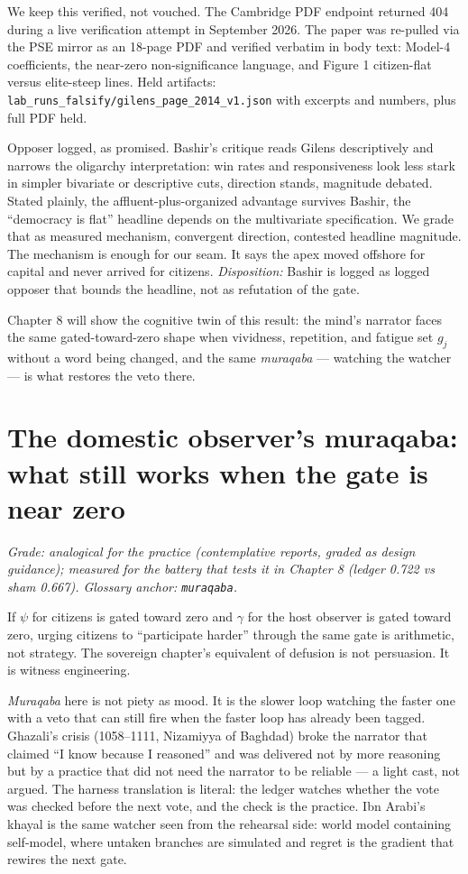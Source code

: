 We keep this verified, not vouched. The Cambridge PDF endpoint returned 404 during a live verification attempt in September 2026. The paper was re-pulled via the PSE mirror as an 18-page PDF and verified verbatim in body text: Model-4 coefficients, the near-zero non-significance language, and Figure 1 citizen-flat versus elite-steep lines. Held artifacts: \texttt{lab\_runs\_falsify/gilens\_page\_2014\_v1.json} with excerpts and numbers, plus full PDF held.

Opposer logged, as promised. Bashir's critique reads Gilens descriptively and narrows the oligarchy interpretation: win rates and responsiveness look less stark in simpler bivariate or descriptive cuts, direction stands, magnitude debated. Stated plainly, the affluent-plus-organized advantage survives Bashir, the ``democracy is flat'' headline depends on the multivariate specification. We grade that as measured mechanism, convergent direction, contested headline magnitude. The mechanism is enough for our seam. It says the apex moved offshore for capital and never arrived for citizens. \textit{Disposition:} Bashir is logged as logged opposer that bounds the headline, not as refutation of the gate.

Chapter 8 will show the cognitive twin of this result: the mind's narrator faces the same gated-toward-zero shape when vividness, repetition, and fatigue set $g_j$ without a word being changed, and the same \textit{muraqaba} --- watching the watcher --- is what restores the veto there.

\section{The domestic observer's muraqaba: what still works when the gate is near zero}
\label{sec:muraqaba-sovereign}

\textit{Grade: analogical for the practice (contemplative reports, graded as design guidance); measured for the battery that tests it in Chapter 8 (ledger 0.722 vs sham 0.667). Glossary anchor: \texttt{muraqaba}.}

If $\psi$ for citizens is gated toward zero and $\gamma$ for the host observer is gated toward zero, urging citizens to ``participate harder'' through the same gate is arithmetic, not strategy. The sovereign chapter's equivalent of defusion is not persuasion. It is witness engineering.

\textit{Muraqaba} here is not piety as mood. It is the slower loop watching the faster one with a veto that can still fire when the faster loop has already been tagged. Ghazali's crisis (1058--1111, Nizamiyya of Baghdad) broke the narrator that claimed ``I know because I reasoned'' and was delivered not by more reasoning but by a practice that did not need the narrator to be reliable --- a light cast, not argued. The harness translation is literal: the ledger watches whether the vote was checked before the next vote, and the check is the practice. Ibn Arabi's khayal is the same watcher seen from the rehearsal side: world model containing self-model, where untaken branches are simulated and regret is the gradient that rewires the next gate.


